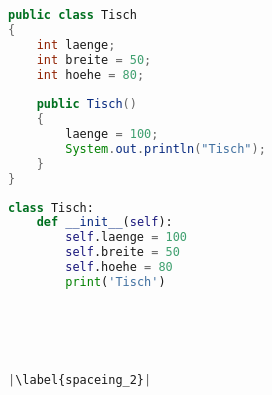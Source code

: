 \begin{minipage}{.5\linewidth}
\begin{lstlisting}[language=java,caption={Attribute/Variablen in Java},captionpos=b,label={lst:java:variablen},frame=none,escapechar=|]
public class Tisch
{
    int laenge;
    int breite = 50;
    int hoehe = 80;
    
    public Tisch()
    {
        laenge = 100;
        System.out.println("Tisch");
    }
}
\end{lstlisting}
\end{minipage}
\begin{minipage}{.5\linewidth}
\begin{lstlisting}[language=python,caption={Attribute/Variablen in Python},captionpos=b,label={lst:python:variablen},frame=l,escapechar=|]
class Tisch:
    def __init__(self):
        self.laenge = 100
        self.breite = 50
        self.hoehe = 80
        print('Tisch')





|\label{spaceing_2}|
\end{lstlisting}
\end{minipage}

